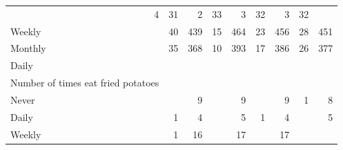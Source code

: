 \documentclass{article}
\begin{document}
\begin{table}[!h]
{\begin{tabular}{lllllllll}
			\multicolumn{1}{|r}{4} &
			\multicolumn{1}{r}{31} &
			\multicolumn{1}{r}{2} &
			\multicolumn{1}{r}{33} &
			\multicolumn{1}{r}{3} &
			\multicolumn{1}{r}{32} &
			\multicolumn{1}{r}{3} &
			\multicolumn{1}{r}{32} \\
			\multicolumn{1}{l}{\hspace{5em}Weekly} &
			\multicolumn{1}{|r}{40} &
			\multicolumn{1}{r}{439} &
			\multicolumn{1}{r}{15} &
			\multicolumn{1}{r}{464} &
			\multicolumn{1}{r}{23} &
			\multicolumn{1}{r}{456} &
			\multicolumn{1}{r}{28} &
			\multicolumn{1}{r}{451} \\
			\multicolumn{1}{l}{\hspace{5em}Monthly} &
			\multicolumn{1}{|r}{35} &
			\multicolumn{1}{r}{368} &
			\multicolumn{1}{r}{10} &
			\multicolumn{1}{r}{393} &
			\multicolumn{1}{r}{17} &
			\multicolumn{1}{r}{386} &
			\multicolumn{1}{r}{26} &
			\multicolumn{1}{r}{377} \\
			\multicolumn{1}{l}{\hspace{3em}Daily} &
			\multicolumn{1}{|r}{} &
			\multicolumn{1}{r}{} &
			\multicolumn{1}{r}{} &
			\multicolumn{1}{r}{} &
			\multicolumn{1}{r}{} &
			\multicolumn{1}{r}{} &
			\multicolumn{1}{r}{} &
			\multicolumn{1}{r}{} \\
			\multicolumn{1}{l}{\hspace{4em}Number of times eat fried potatoes} &
			\multicolumn{1}{|r}{} &
			\multicolumn{1}{r}{} &
			\multicolumn{1}{r}{} &
			\multicolumn{1}{r}{} &
			\multicolumn{1}{r}{} &
			\multicolumn{1}{r}{} &
			\multicolumn{1}{r}{} &
			\multicolumn{1}{r}{} \\
			\multicolumn{1}{l}{\hspace{5em}Never} &
			\multicolumn{1}{|r}{} &
			\multicolumn{1}{r}{9} &
			\multicolumn{1}{r}{} &
			\multicolumn{1}{r}{9} &
			\multicolumn{1}{r}{} &
			\multicolumn{1}{r}{9} &
			\multicolumn{1}{r}{1} &
			\multicolumn{1}{r}{8} \\
			\multicolumn{1}{l}{\hspace{5em}Daily} &
			\multicolumn{1}{|r}{1} &
			\multicolumn{1}{r}{4} &
			\multicolumn{1}{r}{} &
			\multicolumn{1}{r}{5} &
			\multicolumn{1}{r}{1} &
			\multicolumn{1}{r}{4} &
			\multicolumn{1}{r}{} &
			\multicolumn{1}{r}{5} \\
			\multicolumn{1}{l}{\hspace{5em}Weekly} &
			\multicolumn{1}{|r}{1} &
			\multicolumn{1}{r}{16} &
			\multicolumn{1}{r}{} &
			\multicolumn{1}{r}{17} &
			\multicolumn{1}{r}{} &
			\multicolumn{1}{r}{17} &
			\multicolumn{1}{r}{} &

\end{tabular}}
\end{table}
\end{document}
